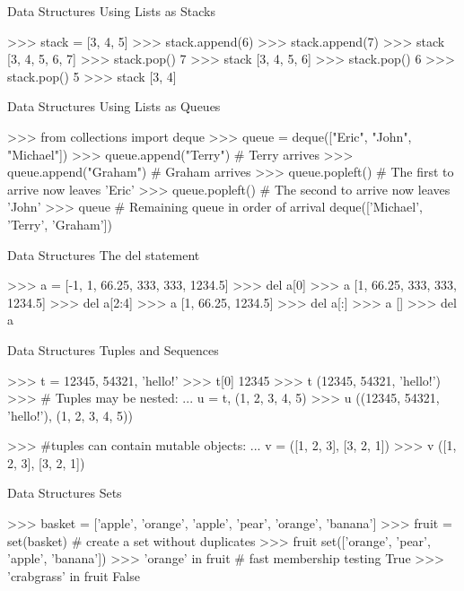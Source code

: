 \documentclass[11pt]{beamer}
\begin{document}
\begin{frame}[containsverbatim]{Data Structures}
Using Lists as Stacks
\begin{python}
>>> stack = [3, 4, 5]
>>> stack.append(6)
>>> stack.append(7)
>>> stack
[3, 4, 5, 6, 7]
>>> stack.pop()
7
>>> stack
[3, 4, 5, 6]
>>> stack.pop()
6
>>> stack.pop()
5
>>> stack
[3, 4]
\end{python}
\end{frame}


\begin{frame}[containsverbatim]{Data Structures}
Using Lists as Queues
\begin{python}
>>> from collections import deque
>>> queue = deque(["Eric", "John", "Michael"])
>>> queue.append("Terry")           # Terry arrives
>>> queue.append("Graham")          # Graham arrives
>>> queue.popleft()                 # The first to arrive now leaves
'Eric'
>>> queue.popleft()                 # The second to arrive now leaves
'John'
>>> queue                      # Remaining queue in order of arrival
deque(['Michael', 'Terry', 'Graham'])
\end{python}
\end{frame}


\begin{frame}[containsverbatim]{Data Structures}
The del statement
\begin{python}
>>> a = [-1, 1, 66.25, 333, 333, 1234.5]
>>> del a[0]
>>> a
[1, 66.25, 333, 333, 1234.5]
>>> del a[2:4]
>>> a
[1, 66.25, 1234.5]
>>> del a[:]
>>> a
[]
>>> del a
\end{python}
\end{frame}


\begin{frame}[containsverbatim]{Data Structures}
Tuples and Sequences
\begin{python}
>>> t = 12345, 54321, 'hello!'
>>> t[0]
12345
>>> t
(12345, 54321, 'hello!')
>>> # Tuples may be nested:
... u = t, (1, 2, 3, 4, 5)
>>> u
((12345, 54321, 'hello!'), (1, 2, 3, 4, 5))

>>> #tuples can contain mutable objects:
... v = ([1, 2, 3], [3, 2, 1])
>>> v
([1, 2, 3], [3, 2, 1])
\end{python}
\end{frame}


\begin{frame}[containsverbatim]{Data Structures}
Sets
\begin{python}
>>> basket = ['apple', 'orange', 'apple', 'pear', 'orange', 'banana']
>>> fruit = set(basket)       # create a set without duplicates
>>> fruit
set(['orange', 'pear', 'apple', 'banana'])
>>> 'orange' in fruit                 # fast membership testing
True
>>> 'crabgrass' in fruit
False

\end{python}
\end{frame}
\end{document}
